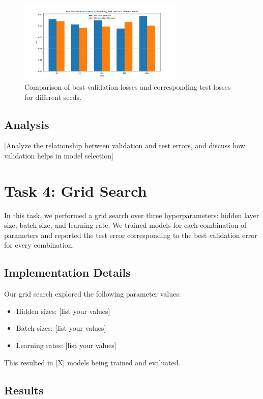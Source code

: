 \documentclass[12pt]{article}
\begin{document}
\begin{figure}[H]
    \centering
    \includegraphics[width=0.7\textwidth]{validation_test_loss_comparison.png}
    \caption{Comparison of best validation losses and corresponding test losses for different seeds.}
    \label{fig:val_test_comparison}
\end{figure}

\subsection{Analysis}
[Analyze the relationship between validation and test errors, and discuss how validation helps in model selection]

\section{Task 4: Grid Search}

In this task, we performed a grid search over three hyperparameters: hidden layer size, batch size, and learning rate. We trained models for each combination of parameters and reported the test error corresponding to the best validation error for every combination.

\subsection{Implementation Details}
Our grid search explored the following parameter values:
\begin{itemize}
    \item Hidden sizes: [list your values]
    \item Batch sizes: [list your values]
    \item Learning rates: [list your values]
\end{itemize}

This resulted in [X] models being trained and evaluated.

\subsection{Results}
\end{document}
